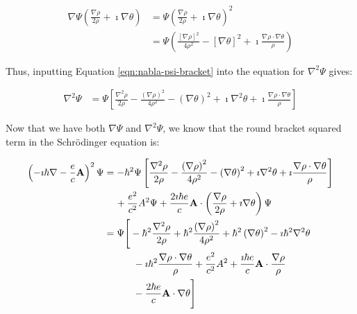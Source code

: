 \begin{align}
    \nabla \Psi \left( \frac{ \nabla \rho}{2 \rho} + \imath \nabla \theta
    \right)
    &= \Psi \left( \frac{\nabla \rho}{2\rho} + \imath \nabla \theta \right)^2 \\
    &= \Psi \left( \frac{\left[ \nabla \rho \right]^2}{4 \rho^2} - \left[ \nabla \theta
        \right] ^2 + \imath \frac{\nabla \rho \cdot \nabla \theta}{\rho} \right)
        \label{eqn:nabla-psi-bracket}
\end{align}

Thus, inputting Equation \ref{eqn:nabla-psi-bracket} into the equation for
$\nabla^2 \Psi$ gives:

\begin{align}
    \nabla^2 \Psi
    &= \Psi \left[ \frac{\nabla^2 \rho}{2 \rho} - \frac{ \left(
        \nabla \rho \right)^2}{4 \rho^2} - \left( \nabla \theta \right)^2 + \imath
        \nabla^2 \theta + \imath \frac{\nabla \rho \cdot \nabla \theta}{\rho} \right]
\end{align}

Now that we have both $\nabla \Psi$ and $\nabla^2 \Psi$, we know that the round
bracket squared term in the Schr\"odinger equation is:

\begin{align}
    \left( -\imath \hbar \nabla - \frac{e}{c} \mathbf{A} \right)^2 \Psi
    &= -\hbar^2 \Psi \left[ \frac{\nabla^2 \rho}{2 \rho} - \frac{ \left(
        \nabla \rho \right)^2}{4 \rho^2} - \left( \nabla \theta \right)^2 + \imath
        \nabla^2 \theta + \imath \frac{\nabla \rho \cdot \nabla \theta}{\rho} \right]
        \notag \\
      & \hspace{11.5pt} + \frac{e^2}{c^2} A^2 \Psi + \frac{2 \imath \hbar e}{c}
        \mathbf{A} \cdot \left( \frac{\nabla \rho}{2 \rho} + \imath \nabla
        \theta \right) \Psi \\
    &=  \Psi \Bigg[ - \hbar^2 \frac{\nabla^2 \rho}{2\rho} + \hbar^2 \frac{\left(
        \nabla \rho \right)^2}{4 \rho^2} + \hbar^2 \left( \nabla \theta
        \right)^2 - \imath \hbar^2
        \nabla^2 \theta
        \notag \\
      & \hspace{30pt} - \imath \hbar^2 \frac{\nabla \rho \cdot \nabla
        \theta}{\rho} + \frac{e^2}{c^2} A^2 + \frac{\imath \hbar e}{c}
        \mathbf{A} \cdot \frac{\nabla \rho}{\rho} \\
      & \hspace{30pt} - \frac{2 \hbar e}{c} \mathbf{A} \cdot \nabla \theta
        \Bigg]
\end{align}

